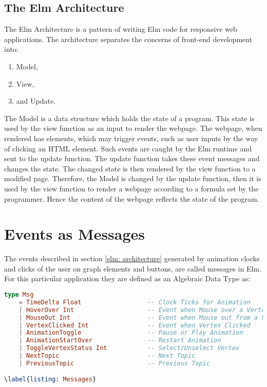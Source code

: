 \subsection{The Elm Architecture}
\label{elm: architecture}
The Elm Architecture is a pattern of writing Elm code for responsive web
applications.  The architecture separates the concerns of front-end development
into:

\begin{enumerate}
\item Model,
\item View,
\item and Update.
\end{enumerate}

The Model is a data structure which holds the state of a program.
\cite{Fairbank19} This state is used by the view function as an input to
render the webpage.  The webpage, when rendered has elements, which may trigger
events, such as user inputs by the way of clicking an HTML element. Such events
are caught by the Elm runtime and sent to the update function.  The update
function takes these event messages and changes the state. The changed state is
then rendered by the view function to a modified page.  Therefore, the Model is
changed by the update function, then it is used by the view function to
render a webpage according to a formula set by the programmer. Hence the content
of the webpage reflects the state of the program.


\section{Events as Messages}
\label{impl: messages}
The events described in section \autoref{elm: architecture} generated by
animation clocks and clicks of the user on graph elements and buttons, are
called messages in Elm. For this particular
application they are defined as an Algebraic Data Type as:

\begin{lstlisting}[language=elm
                  , caption={
                              Abstract Data Type Msg with its Data Constructors.
                              These messages are dispached by buttons, graph vertices
                              system clocks and are received by the update function
                              to change the $Model$, which carries the state of the
                              program.
                  }
                  ]
type Msg
    = TimeDelta Float                  -- Clock Ticks for Animation
    | HoverOver Int                    -- Event when Mouse over a Vertex                              
    | MouseOut Int                     -- Event when Mouse out from a Vertex                               
    | VertexClicked Int                -- Event when Vertex Clicked                              
    | AnimationToggle                  -- Pause or Play Animation
    | AnimationStartOver               -- Restart Animation
    | ToggleVertexStatus Int           -- Select/Unselect Vertex
    | NextTopic                        -- Next Topic
    | PreviousTopic                    -- Previous Topic

\label{listing: Messages}
\end{lstlisting}


